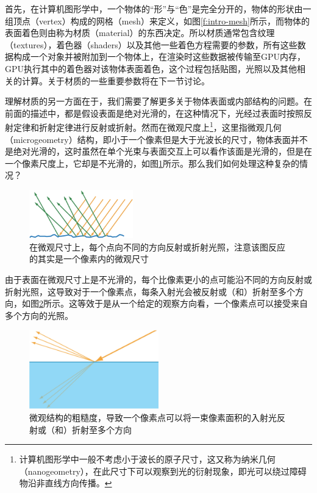 首先，在计算机图形学中，一个物体的“形”与“色”是完全分开的，物体的形状由一组顶点（vertex）构成的网格（mesh）来定义，如图\ref{f:intro-mesh}所示，而物体的表面着色则由称为材质（material）的东西决定。所以材质通常包含纹理（textures），着色器（shaders）以及其他一些着色方程需要的参数，所有这些数据构成一个对象并被附加到一个物体上，在渲染时这些数据被传输至GPU内存，GPU执行其中的着色器对该物体表面着色，这个过程包括贴图，光照以及其他相关的计算。关于材质的一些重要参数将在下一节讨论。

理解材质的另一方面在于，我们需要了解更多关于物体表面或内部结构的问题。在前面的描述中，都是假设表面是绝对光滑的，在这种情况下，光经过表面时按照反射定律和折射定律进行反射或折射。然而在微观尺度上\footnote{计算机图形学中一般不考虑小于波长的原子尺寸，这又称为纳米几何（nanogeometry），在此尺寸下可以观察到光的衍射现象，即光可以绕过障碍物沿非直线方向传播。}，这里指微观几何（microgeometry）结构，即小于一个像素但是大于光波长的尺寸，物体表面并不是绝对光滑的，这时虽然在单个光束与表面交互上可以看作该面是光滑的，但是在一个像素尺度上，它却是不光滑的，如图\ref{f:intro-microgeometry-1}所示。那么我们如何处理这种复杂的情况？

\begin{figure}
\sidecaption
	\includegraphics[width=0.4\textwidth]{figures/intro/ray-optics-3}
	\caption{在微观尺寸上，每个点向不同的方向反射或折射光照，注意该图反应的其实是一个像素内的微观尺寸}
	\label{f:intro-microgeometry-1}
\end{figure}

由于表面在微观尺寸上是不光滑的，每个比像素更小的点可能沿不同的方向反射或折射光照，这导致对于一个像素点，每条入射光会被反射或（和）折射至多个方向，如图\ref{f:intro-multi-rays}所示。这等效于是从一个给定的观察方向看，一个像素点可以接受来自多个方向的光照。

\begin{figure}
\sidecaption
	\includegraphics[width=0.5\textwidth]{figures/intro/ray-optics-4}
	\caption{微观结构的粗糙度，导致一个像素点可以将一束像素面积的入射光反射或（和）折射至多个方向}
	\label{f:intro-multi-rays}
\end{figure}

